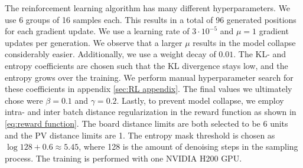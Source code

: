 The reinforcement learning algorithm has many different hyperparameters. We use 6 groups of 16 samples each. This results in a total of 96 generated positions for each gradient update. We use a learning rate of $3\cdot 10^{-5}$ and $\mu = 1$ gradient updates per generation. We observe that a larger $\mu$ results in the model collapse considerably easier. Additionally, we use a weight decay of $0.01$. The KL- and entropy coefficients are chosen such that the KL divergence stays low, and the entropy grows over the training. We perform manual hyperparameter search for these coefficients in appendix \ref{sec:RL appendix}. The final values we ultimately chose were $\beta = 0.1$ and $\gamma = 0.2$. Lastly, to prevent model collapse, we employ intra- and inter batch distance regularization in the reward function as shown in \eqref{eq:reward function}. The board distance limits are both selected to be 6 units and the PV distance limits are 1. The entropy mask threshold is chosen as $\log 128 + 0.6 \approx 5.45$, where 128 is the amount of denoising steps in the sampling process. The training is performed with one NVIDIA H200 GPU.
